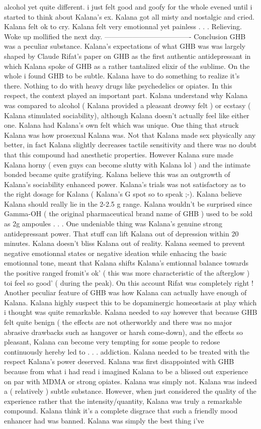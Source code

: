\documentclass[12pt]{book}
\begin{document}
alcohol yet quite different. i just felt good and goofy for the whole evened until i started to think about Kalana's ex. Kalana got all misty and nostalgic and cried. Kalana felt ok to cry. Kalana felt very emotionnal yet painless . . .  Relieving. Woke up mollified the next day. ------------------------------------- Conclusion GHB was a peculiar substance. Kalana's expectations of what GHB was was largely shaped by Claude Rifat's paper on GHB as the first authentic antidepressant in which Kalana spoke of GHB as a rather tantalized elixir of the sublime. On the whole i found GHB to be subtle. Kalana have to do something to realize it's there. Nothing to do with heavy drugs like psychedelics or opiates. In this respect, the context played an important part. Kalana understand why Kalana was compared to alcohol ( Kalana provided a pleasant drowsy felt ) or ecstasy ( Kalana stimulated sociability), although Kalana doesn't actually feel like either one. Kalana had Kalana's own felt which was unique. One thing that struck Kalana was how prosexual Kalana was. Not that Kalana made sex physically any better, in fact Kalana slightly decreases tactile sensitivity and there was no doubt that this compound had anesthetic properties. However Kalana sure made Kalana horny ( even guys can become slutty with Kalana lol ) and the intimate bonded became quite gratifying. Kalana believe this was an outgrowth of Kalana's sociability enhanced power. Kalana's trials was not satisfactory as to the right dosage for Kalana ( Kalana's G spot so to speak ;-). Kalana believe Kalana should really lie in the 2-2.5 g range. Kalana wouldn't be surprised since Gamma-OH ( the original pharmaceutical brand name of GHB ) used to be sold as 2g ampoules . . .  One undeniable thing was Kalana's genuine strong antidepressant power. That stuff can lift Kalana out of depression within 20 minutes. Kalana doesn't bliss Kalana out of reality. Kalana seemed to prevent negative emotionnal states or negative ideation while enhacing the basic emotionnal tone, meant that Kalana shifts Kalana's emtionnal balance towards the positive ranged fromit's ok' ( this was more characteristic of the afterglow ) toi feel so good' ( during the peak). On this account Rifat was completely right ! Another peculiar feature of GHB was how Kalana can actually have enough of Kalana. Kalana highly suspect this to be dopaminergic homeostasis at play which i thought was quite remarkable. Kalana needed to say however that because GHB felt quite benign ( the effects are not otherworldy and there was no major abrasive drawbacks such as hangover or harsh come-down), and the effects so pleasant, Kalana can become very tempting for some people to redose continuously hereby led to . . .  addiction. Kalana needed to be treated with the respect Kalana's power deserved. Kalana was first disappointed with GHB because from what i had read i imagined Kalana to be a blissed out experience on par with MDMA or strong opiates. Kalana was simply not. Kalana was indeed a ( relatively ) subtle substance. However, when just considered the quality of the experience rather that the intensity/quantity, Kalana was truly a remarkable compound. Kalana think it's a complete disgrace that such a friendly mood enhancer had was banned. Kalana was simply the best thing i've 
\end{document}
